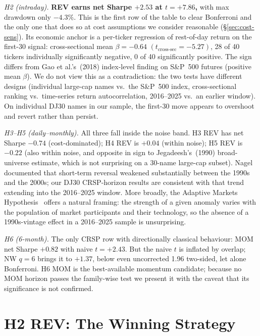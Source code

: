 \documentclass[10pt,conference,compsoc]{IEEEtran}
\begin{document}
\emph{H2 (intraday).} \textbf{REV earns net Sharpe $+2.53$ at
$t = +7.86$,} with max drawdown only $-4.3\%$. This is the first row
of the table to clear Bonferroni and the only one that does so at
cost assumptions we consider reasonable (\S\ref{sec:cost-sens}). Its
economic anchor is a per-ticker regression of rest-of-day return
on the first-30 signal: cross-sectional mean $\beta = -0.64$
$(t_{\text{cross-sec}} = -5.27)$, 28 of 40 tickers individually
significantly negative, 0 of 40 significantly positive. The sign
differs from Gao et al.'s~(2018) index-level finding on S\&P~500
futures (positive mean $\beta$). We do not view this as a
contradiction: the two tests have different designs (individual
large-cap names vs.\ the S\&P~500 index, cross-sectional ranking
vs.\ time-series return autocorrelation, 2016--2025 vs.\ an
earlier window). On individual DJ30 names in our sample, the
first-30 move appears to overshoot and revert rather than
persist.

\emph{H3--H5 (daily--monthly).} All three fall inside the noise
band. H3 REV has net Sharpe $-0.74$ (cost-dominated); H4 REV is
$+0.04$ (within noise); H5 REV is $-0.22$ (also within noise, and
opposite in sign to Jegadeesh's~(1990) broad-universe estimate,
which is not surprising on a 30-name large-cap subset). Nagel~\cite{nagel2012}
documented that short-term reversal weakened substantially between
the 1990s and the 2000s; our DJ30 CRSP-horizon results are
consistent with that trend extending into the 2016--2025 window.
More broadly, the Adaptive Markets Hypothesis~\cite{lo2004} offers
a natural framing: the strength of a given anomaly varies with
the population of market participants and their technology, so the
absence of a 1990s-vintage effect in a 2016--2025 sample is
unsurprising.

\emph{H6 (6-month).} The only CRSP row with directionally classical
behaviour: MOM net Sharpe $+0.82$ with naive $t = +2.43$. But the
naive $t$ is inflated by overlap; NW $q{=}6$ brings it to
\textbf{$+1.37$}, below even uncorrected 1.96 two-sided, let alone
Bonferroni. H6 MOM is the best-available momentum candidate;
because no MOM horizon passes the family-wise test we present it
with the caveat that its significance is not confirmed.

\section{H2 REV: The Winning Strategy}
\label{sec:h2}
\end{document}
